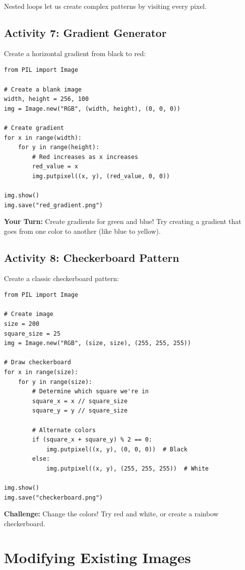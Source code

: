 \documentclass[11pt]{article}
\begin{document}
Nested loops let us create complex patterns by visiting every pixel.

\subsection*{Activity 7: Gradient Generator}

Create a horizontal gradient from black to red:

\begin{lstlisting}
from PIL import Image

# Create a blank image
width, height = 256, 100
img = Image.new("RGB", (width, height), (0, 0, 0))

# Create gradient
for x in range(width):
    for y in range(height):
        # Red increases as x increases
        red_value = x
        img.putpixel((x, y), (red_value, 0, 0))

img.show()
img.save("red_gradient.png")
\end{lstlisting}

\textbf{Your Turn:} Create gradients for green and blue! Try creating a gradient that goes from one color to another (like blue to yellow).

\subsection*{Activity 8: Checkerboard Pattern}

Create a classic checkerboard pattern:

\begin{lstlisting}
from PIL import Image

# Create image
size = 200
square_size = 25
img = Image.new("RGB", (size, size), (255, 255, 255))

# Draw checkerboard
for x in range(size):
    for y in range(size):
        # Determine which square we're in
        square_x = x // square_size
        square_y = y // square_size

        # Alternate colors
        if (square_x + square_y) % 2 == 0:
            img.putpixel((x, y), (0, 0, 0))  # Black
        else:
            img.putpixel((x, y), (255, 255, 255))  # White

img.show()
img.save("checkerboard.png")
\end{lstlisting}

\textbf{Challenge:} Change the colors! Try red and white, or create a rainbow checkerboard.

\section{Modifying Existing Images}
\end{document}
